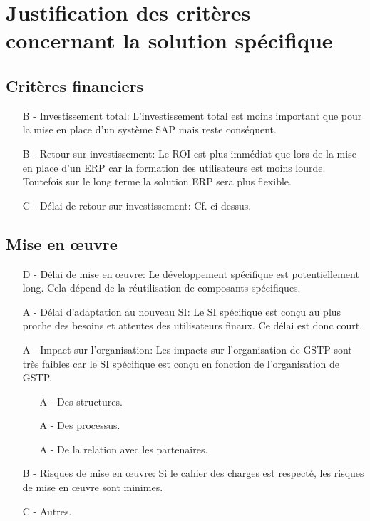 \section{Justification des critères concernant la solution spécifique}

\subsection{Critères financiers}

\begin{itemize}
\item[B -] Investissement total:\el
L'investissement total est moins important que pour la mise en place d'un
système SAP mais reste conséquent.

\item[B -] Retour sur investissement:\el
Le ROI est plus immédiat que lors de la mise en place d'un ERP car la
formation des utilisateurs est moins lourde. Toutefois sur le long terme la
solution ERP sera plus flexible.

\item[C -] Délai de retour sur investissement:\el
Cf. ci-dessus.
\end{itemize}

\subsection{Mise en œuvre}

\begin{itemize}
\item[D -] Délai de mise en œuvre:\el
Le développement spécifique est potentiellement long. Cela dépend de la
réutilisation de composants spécifiques.

\item[A -] Délai d'adaptation au nouveau SI:\el
Le SI spécifique est conçu au plus proche des besoins et attentes des
utilisateurs finaux. Ce délai est donc court.

\item[A -] Impact sur l'organisation:\el
Les impacts sur l'organisation de GSTP sont très faibles car le SI
spécifique est conçu en fonction de l'organisation de GSTP.

\begin{itemize}
	\item[A -] Des structures.

	\item[A -] Des processus.

	\item[A -] De la relation avec les partenaires.
\end{itemize}

\item[B -] Risques de mise en œuvre:\el
Si le cahier des charges est respecté, les risques de mise en \oe{}uvre
sont minimes.

\item[C -] Autres.
\end{itemize}

